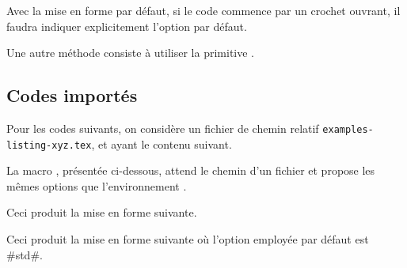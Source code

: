 

\begin{tdocwarn}
    Avec la mise en forme par défaut, si le code commence par un crochet ouvrant, il faudra indiquer explicitement l'option par défaut.


    \smallskip

    Une autre méthode consiste à utiliser la primitive .

\end{tdocwarn}


\subsection{Codes importés}

Pour les codes suivants, on considère un fichier de chemin relatif \verb+examples-listing-xyz.tex+, et ayant le contenu suivant.



\medskip

La macro , présentée ci-dessous, attend le chemin d'un fichier et propose les mêmes options que l'environnement .




\begin{tdocexa}
    \leavevmode

    \begin{tdoclatex}[code]

    \end{tdoclatex}

    Ceci produit la mise en forme suivante.


\end{tdocexa}




\begin{tdocexa}[À la suite]
    \leavevmode

    \begin{tdoclatex}[code]

    \end{tdoclatex}

    Ceci produit la mise en forme suivante où l'option employée par défaut est \tdocinlatex#std#.


\end{tdocexa}


